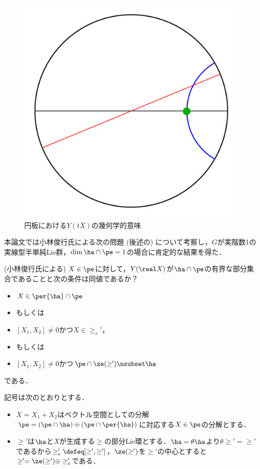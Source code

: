 \begin{figure}[H]
  \centering
  \includegraphics[scale=0.3]{../graph/y-and-z.pdf}
  \caption{{\Poincare}円板における$Y(tX) $の幾何学的意味}
  \label{fig:y-and-z}
\end{figure}

本論文では小林俊行氏による次の問題 (後述の) について考察し，$G$が実階数1の実線型半単純Lie群，$\dim\ha\cap \pe=1$の場合に肯定的な結果を得た．
\begin{prob*}(小林俊行氏による)
  $X\in  \pe$に対して，$Y(\real X)$が$ \ha\cap \pe$の有界な部分集合であることと次の条件は同値であるか？
  \begin{cond*}
    \leavevmode
    \begin{itemize}
    \item $X\in \per{\ha}\cap\pe $
    \item[] もしくは
    \item $[X_1, X_2] \neq 0 $かつ$X\in \ge_{s}' $，
    \item[] もしくは
    \item $[X_1, X_2] \neq 0 $かつ$\pe\cap \ze(\ge') \nsubset \ha  $
    \end{itemize}
    である．
  \end{cond*}

  記号は次のとおりとする．
  \begin{itemize}
  \item $X = X_1 + X_2 $はベクトル空間としての分解$\pe =(\pe\cap \ha)\oplus(\pe\cap\per{\ha}) $に対応する$X\in \pe$の分解とする．
  \item $\ge ' $は$\ha$と$X$が生成する$\ge$の部分Lie環とする．$\ha = \theta \ha$より$\theta \ge' = \ge'$であるから$\ge'_{s} \defeq [\ge',\ge'] $，$\ze(\ge') $を$\ge'$の中心とすると$\ge' = \ze(\ge') \oplus \ge'_{s} $である．
  \end{itemize}
\end{prob*}

